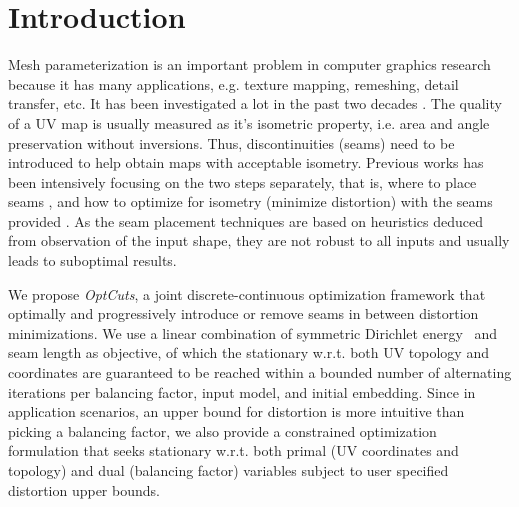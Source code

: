 \section{Introduction}

Mesh parameterization is an important problem in computer graphics research because it has many applications, e.g. texture mapping, remeshing, detail transfer, etc. It has been investigated a lot in the past two decades \cite{some mesh parameterization papers}. The quality of a UV map is usually measured as it's isometric property, i.e. area and angle preservation without inversions. Thus, discontinuities (seams) need to be introduced to help obtain maps with acceptable isometry. Previous works has been intensively focusing on the two steps separately, that is, where to place seams \cite{some seam placement papers}, and how to optimize for isometry (minimize distortion) with the seams provided \cite{some distortion minimization papers}. As the seam placement techniques are based on heuristics deduced from observation of the input shape, they are not robust to all inputs and usually leads to suboptimal results. 

We propose {\em OptCuts}, a joint discrete-continuous optimization framework that optimally and progressively introduce or remove seams in between distortion minimizations. We use a linear combination of symmetric Dirichlet energy~\cite{Smith2015Bijective} and seam length as objective, of which the stationary w.r.t. both UV topology and coordinates are guaranteed to be reached within a bounded number of alternating iterations per balancing factor, input model, and initial embedding.  Since in application scenarios, an upper bound for distortion is more intuitive than picking a balancing factor, we also provide a constrained optimization formulation that seeks stationary w.r.t. both primal (UV coordinates and topology) and dual (balancing factor) variables subject to user specified distortion upper bounds. 



